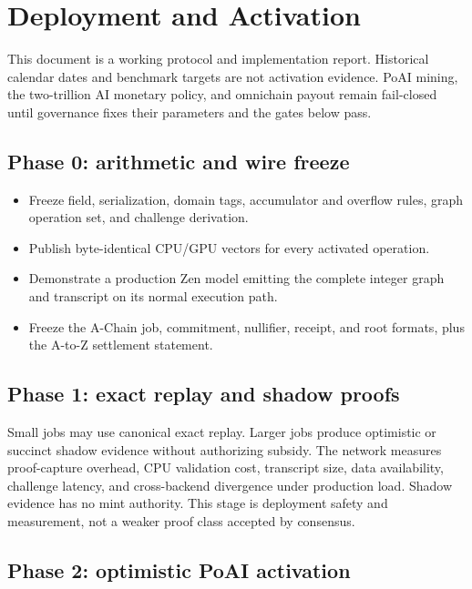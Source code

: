 \section{Deployment and Activation}
\label{sec:deploy}

This document is a working protocol and implementation report. Historical
calendar dates and benchmark targets are not activation evidence. PoAI mining,
the two-trillion AI monetary policy, and omnichain payout remain fail-closed
until governance fixes their parameters and the gates below pass.

\subsection{Phase 0: arithmetic and wire freeze}

\begin{itemize}[leftmargin=1.2em]
  \item Freeze field, serialization, domain tags, accumulator and overflow rules,
        graph operation set, and challenge derivation.
  \item Publish byte-identical CPU/GPU vectors for every activated operation.
  \item Demonstrate a production Zen model emitting the complete integer graph
        and transcript on its normal execution path.
  \item Freeze the A-Chain job, commitment, nullifier, receipt, and root formats,
        plus the A-to-Z settlement statement.
\end{itemize}

\subsection{Phase 1: exact replay and shadow proofs}

Small jobs may use canonical exact replay. Larger jobs produce optimistic or
succinct shadow evidence without authorizing subsidy. The network measures
proof-capture overhead, CPU validation cost, transcript size, data availability,
challenge latency, and cross-backend divergence under production load.
Shadow evidence has no mint authority. This stage is deployment safety and
measurement, not a weaker proof class accepted by consensus.

\subsection{Phase 2: optimistic PoAI activation}

